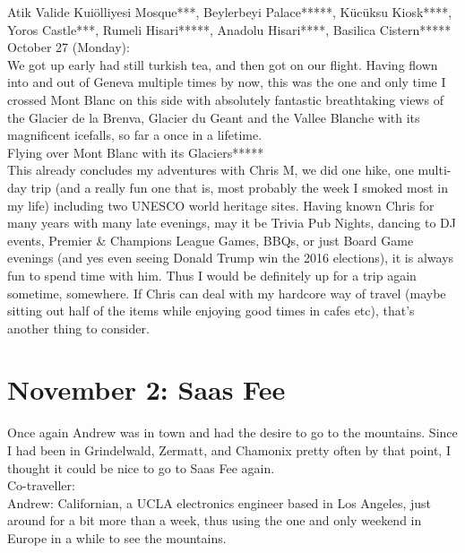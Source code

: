 Atik Valide Kui\"olliyesi Mosque***, Beylerbeyi Palace*****, K\"uc\"uksu Kiosk****, Yoros Castle***, Rumeli Hisari*****, Anadolu Hisari****, Basilica Cistern*****\\

October 27 (Monday):\\
We got up early had still turkish tea, and then got on our flight. Having flown into and out of Geneva multiple times by now, this was the one and only time I crossed Mont Blanc on this side with absolutely fantastic breathtaking views of the Glacier de la Brenva, Glacier du Geant and the Vallee Blanche with its magnificent icefalls, so far a once in a lifetime.\\

Flying over Mont Blanc with its Glaciers*****\\

This already concludes my adventures with Chris M, we did one hike, one multi-day trip (and a really fun one that is, most probably the week I smoked most in my life) including two UNESCO world heritage sites. Having known Chris for many years with many late evenings, may it be Trivia Pub Nights, dancing to DJ events, Premier \& Champions League Games, BBQs, or just Board Game evenings (and yes even seeing Donald Trump win the 2016 elections), it is always fun to spend time with him. Thus I would be definitely up for a trip again sometime, somewhere. If Chris can deal with my hardcore way of travel (maybe sitting out half of the items while enjoying good times in cafes etc), that's another thing to consider.

\section{November 2: Saas Fee}
\label{SaasFee2014}

Once again Andrew was in town and had the desire to go to the mountains. Since I had been in Grindelwald, Zermatt, and Chamonix pretty often by that point, I thought it could be nice to go to Saas Fee again.\\

Co-traveller:\\
Andrew: Californian, a UCLA electronics engineer based in Los Angeles, just around for a bit more than a week, thus using the one and only weekend in Europe in a while to see the mountains.\\

